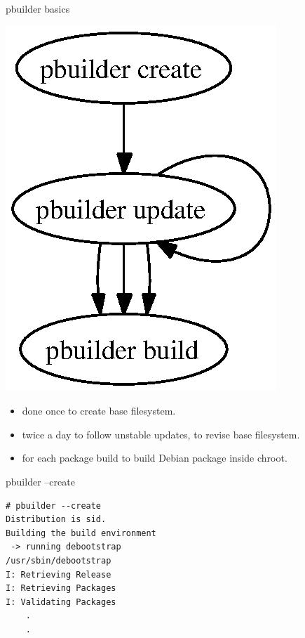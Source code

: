 \documentclass[dvipdfm,17pt,times]{beamer}
\begin{document}
\begin{frame}{pbuilder basics}
\begin{minipage}{0.4\hsize}
\includegraphics[height=0.7\vsize]{pbuildercycle.eps}
\end{minipage}
\begin{minipage}{0.55\hsize}
\begin{itemize}
 \item done once to create base filesystem.
 \item twice a day to follow unstable updates, to revise base
       filesystem.
 \item for each package build to build Debian package inside chroot.
\end{itemize}
\end{minipage}
\end{frame}

\begin{frame}[containsverbatim]{pbuilder --create}
\begin{verbatim}
# pbuilder --create
Distribution is sid.
Building the build environment
 -> running debootstrap
/usr/sbin/debootstrap
I: Retrieving Release
I: Retrieving Packages
I: Validating Packages
	.
	.
\end{verbatim}
\end{frame}
\end{document}
